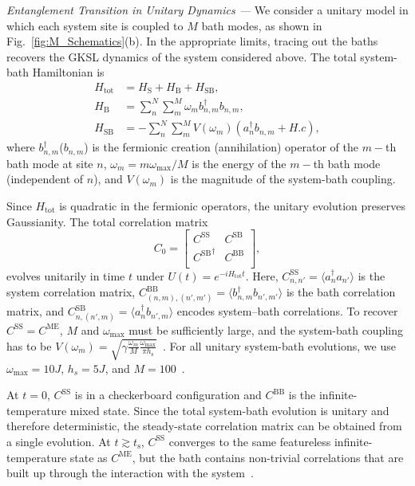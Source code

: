\documentclass[reprint, superscriptaddress, aps, prl]{revtex4-2}
\begin{document}
\textit{Entanglement Transition in Unitary Dynamics ---}
We consider a unitary model in which each system site is coupled to $M$ bath modes, as shown in Fig.~\ref{fig:M_Schematics}(b).
In the appropriate limits, tracing out the baths recovers the GKSL dynamics of the system considered above.
The total system-bath Hamiltonian is
\begin{align}
    H_{\text{tot}} &= H_{\text{S}} + H_{\text{B}} + H_{\text{SB}},  \label{eq:H_tot} \\
    H_{\text{B}}          &= \sum_n^N \sum_m^M \omega^{}_{m} b^\dagger_{n,m}b^{}_{n,m}, \label{eq:H_B} \\
    H_{\text{SB}}         &= - \sum_n^N \sum_m^M V(\omega^{}_m) ( a^\dagger_{n} b^{}_{n,m} + H.c ), \label{eq:H_SB}
\end{align}
where $b^{\dagger}_{n,m}$($b^{}_{n,m}$) is the fermionic creation (annihilation) operator of the $m-$th bath mode at site $n$, $\omega_{m} = m\omega_{\text{max}}/M$ is the energy of the $m-$th bath mode (independent of $n$), and $V(\omega_{m})$ is the magnitude of the system-bath coupling.

Since $H_{\text{tot}}$ is quadratic in the fermionic operators, the unitary evolution preserves Gaussianity.
The total correlation matrix
\begin{equation}
    C_0 =
    \begin{bmatrix}
        C^{\text{SS}} & C^{\text{SB}} \\
        {C^{\text{SB}}}^\dagger & C^{\text{BB}} \\
    \end{bmatrix}
,\end{equation}
evolves unitarily in time $t$ under $U(t) = e^{- i H_{\text{tot}} t}$.
Here, $C^{\text{SS}}_{n,n'} = \langle a_n^\dagger a_{n'} \rangle$ is the system correlation matrix,
$C^{\text{BB}}_{(n,m),(n',m')} = \langle b_{n,m}^\dagger b_{n',m'} \rangle$ is the bath correlation matrix,
and $C^{\text{SB}}_{n,(n',m)} = \langle a_n^\dagger b_{n',m} \rangle$ encodes system–bath correlations.
To recover $C^{\text{SS}} = C^{\text{ME}}$, $M$ and $\omega_{\text{max}}$ must be sufficiently large, and the system-bath coupling has to be $V(\omega_{m}) = \sqrt{\gamma \frac{\omega_{m}}{M} \frac{\omega_{\text{max}}}{\pi h_{\text{s}}}}$~\cite{deVegaWolf2015}.
For all unitary system-bath evolutions, we use $\omega_{\text{max}}=10J$, $h_s=5J$, and $M=100$~\cite{supp}.

At $t = 0$, $C^{\text{SS}}$ is in a checkerboard configuration and $C^{\text{BB}}$ is the infinite-temperature mixed state.
Since the total system-bath evolution is unitary and therefore deterministic, the steady-state correlation matrix can be obtained from a single evolution.
At $t \gtrsim t_{\text{s}}$, $C^{\text{SS}}$ converges to the same featureless infinite-temperature state as $C^{\text{ME}}$, but the bath contains non-trivial correlations that are built up through the interaction with the system~\cite{supp}.
\end{document}
